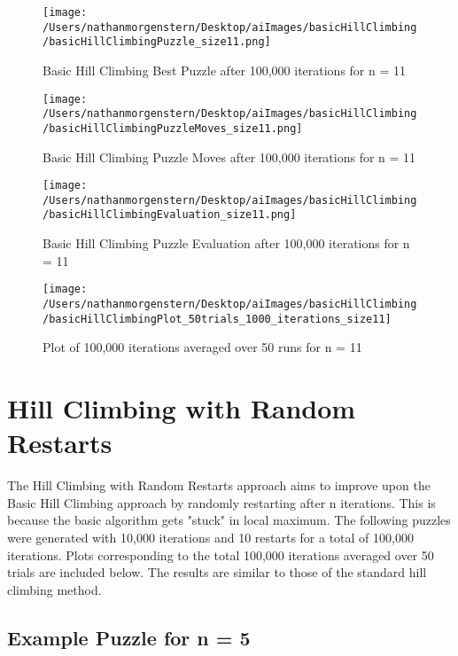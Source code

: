 \documentclass{report}
\begin{document}
	\begin{figure}[H]
	\centering
	\texttt{[image: /Users/nathanmorgenstern/Desktop/aiImages/basicHillClimbing/basicHillClimbingPuzzle\_size11.png]}
	\caption{Basic Hill Climbing Best Puzzle after 100,000 iterations for n = 11} 
	\label{fig: Basic Hill Climbing Best Puzzle after 100,000 iterations for n = 11}
	\end{figure}
	
	\begin{figure}[H]
	\centering
	\texttt{[image: /Users/nathanmorgenstern/Desktop/aiImages/basicHillClimbing/basicHillClimbingPuzzleMoves\_size11.png]}
	\caption{Basic Hill Climbing Puzzle Moves  after 100,000 iterations for n = 11} 
	\label{fig: Basic Hill Climbing Puzzle Moves after 100,000 iterations for n = 11}
	\end{figure}

	\begin{figure}[H]
	\centering
	\texttt{[image: /Users/nathanmorgenstern/Desktop/aiImages/basicHillClimbing/basicHillClimbingEvaluation\_size11.png]}
	\caption{Basic Hill Climbing Puzzle Evaluation after 100,000 iterations for n = 11} 
	\label{fig: Basic Hill Climbing Puzzle Evaluation after 100,000 iterations for n = 11}
	\end{figure}

	\begin{figure}[H]
	\centering
	\texttt{[image: /Users/nathanmorgenstern/Desktop/aiImages/basicHillClimbing/basicHillClimbingPlot\_50trials\_1000\_iterations\_size11]}
	\caption{Plot of 100,000 iterations averaged over 50 runs for n = 11}
	\label{fig: Plot of 100,000 iterations averaged over 50 runs for n = 11}
	\end{figure}

\newpage
\section{Hill Climbing with Random Restarts}
The Hill Climbing with Random Restarts approach aims to improve upon the Basic Hill Climbing approach by randomly restarting after n iterations. This is because the basic algorithm gets "stuck" in local maximum. The following puzzles were generated with 10,000 iterations and 10 restarts for a total of 100,000 iterations. Plots corresponding to the total 100,000 iterations averaged over 50 trials are included below. The results are similar to those of the standard hill climbing method.

\subsection{Example Puzzle for n = 5}
\end{document}
